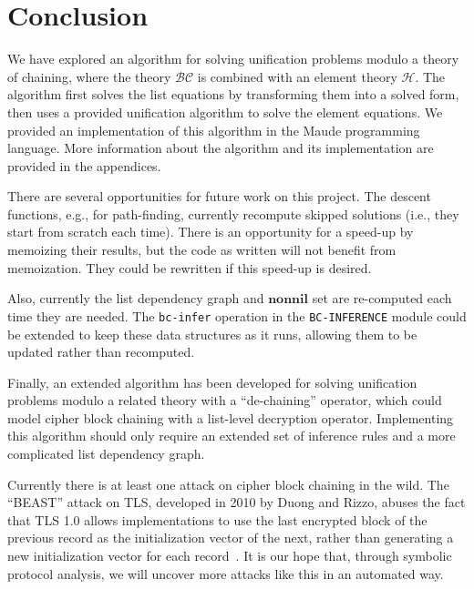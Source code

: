 \documentclass[11pt,twoside,titlepage]{article}
\newcommand{\BC}{\mathcal{BC}}
\newcommand{\HH}{\mathcal{H}}
\newcommand{\Nonnil}{\mathbf{nonnil}}
\begin{document}
\section{Conclusion}\label{section:conclusion}

We have explored an algorithm for solving unification problems modulo a theory
of chaining, where the theory $\BC$ is combined with an element theory $\HH$.
The algorithm first solves the list equations by transforming them into a
solved form, then uses a provided unification algorithm to solve the element
equations. We provided an implementation of this algorithm in the Maude
programming language. More information about the algorithm and its
implementation are provided in the appendices.

There are several opportunities for future work on this project. The descent
functions, e.g., for path-finding, currently recompute skipped solutions (i.e.,
they start from scratch each time). There is an opportunity for a speed-up by
memoizing their results, but the code as written will not benefit from
memoization. They could be rewritten if this speed-up is desired.

Also, currently the list dependency graph and $\Nonnil$ set are re-computed
each time they are needed. The \lstinline|bc-infer| operation in the
\lstinline|BC-INFERENCE| module could be extended to keep these data structures
as it runs, allowing them to be updated rather than recomputed.

Finally, an extended algorithm has been developed for solving unification
problems modulo a related theory with a ``de-chaining'' operator, which could
model cipher block chaining with a list-level decryption operator. Implementing
this algorithm should only require an extended set of inference rules and a
more complicated list dependency graph.

Currently there is at least one attack on cipher block chaining in the wild.
The ``BEAST'' attack on TLS, developed in 2010 by Duong and Rizzo, abuses the
fact that TLS 1.0 allows implementations to use the last encrypted block of the
previous record as the initialization vector of the next, rather than
generating a new initialization vector for each
record~\cite{rizzo2010practical, ekr2011security}. It is our hope that, through
symbolic protocol analysis, we will uncover more attacks like this in an
automated way.

\clearpage


\clearpage
\appendix
\end{document}
